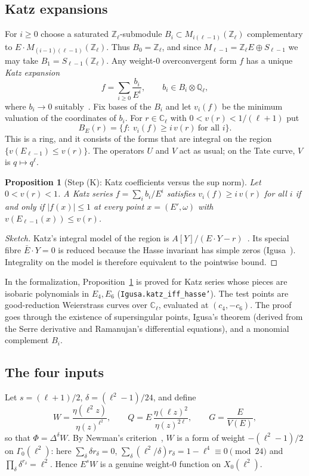 \documentclass[11pt]{amsart}
\newcommand{\Zl}{\mathbb{Z}_\ell}
\newcommand{\Ql}{\mathbb{Q}_\ell}
\newcommand{\Cl}{\mathbb{C}_\ell}
\newcommand{\lean}[1]{\texttt{#1}}
\theoremstyle{plain}
\newtheorem{proposition}[theorem]{Proposition}
\theoremstyle{definition}
\numberwithin{equation}{section}
\begin{document}
\subsection{Katz expansions}
For $i\ge0$ choose a saturated $\Zl$-submodule $B_i\subset M_{i(\ell-1)}(\Zl)$ complementary to
$E\cdot M_{(i-1)(\ell-1)}(\Zl)$. Thus $B_0=\Zl$, and since $M_{\ell-1}=\Zl E\oplus S_{\ell-1}$ we may take
$B_1=S_{\ell-1}(\Zl)$. Any weight-$0$ overconvergent form $f$ has a unique \emph{Katz expansion}
\[
  f=\sum_{i\ge0}\frac{b_i}{E^i},\qquad b_i\in B_i\otimes\Ql,
\]
where $b_i\to0$ suitably~\cite[\S2.6]{Katz1973}. Fix bases of the $B_i$ and let $v_i(f)$ be the minimum valuation of
the coordinates of $b_i$. For $r\in\Cl$ with $0<v(r)<1/(\ell+1)$ put
\[
  B_E(r)=\{f:\ v_i(f)\ge i\,v(r)\ \text{for all } i\}.
\]
This is a ring, and it consists of the forms that are integral on the region $\{v(E_{\ell-1})\le v(r)\}$. The operators
$U$ and $V$ act as usual; on the Tate curve, $V$ is $q\mapsto q^\ell$.

\begin{proposition}[Step (K): Katz coefficients versus the sup norm]\label{prop:K}
Let $0<v(r)<1$. A Katz series $f=\sum_i b_i/E^i$ satisfies $v_i(f)\ge i\,v(r)$ for all $i$ if and only if
$|f(x)|\le1$ at every point $x=(E',\omega)$ with $v(E_{\ell-1}(x))\le v(r)$.
\end{proposition}
\begin{proof}[Sketch]
Katz's integral model of the region is $A[Y]/(E\cdot Y-r)$~\cite[\S\S2.6--2.8]{Katz1973}. Its special fibre $\bar E\cdot Y=0$ is
reduced because the Hasse invariant has simple zeros (Igusa~\cite{Igusa1958}). Integrality on the model is therefore
equivalent to the pointwise bound.
\end{proof}

In the formalization, Proposition~\ref{prop:K} is proved for Katz series whose pieces are isobaric polynomials in
$E_4,E_6$ (\lean{Igusa.katz\_iff\_hasse'}). The test points are good-reduction Weierstrass curves over $\Cl$, evaluated at
$(c_4,-c_6)$. The proof goes through the existence of supersingular points, Igusa's theorem (derived from the Serre
derivative and Ramanujan's differential equations), and a monomial complement $B_i$.

\subsection{The four inputs}\label{sec:inputs}
Let $s=(\ell+1)/2$, $\delta=(\ell^2-1)/24$, and define
\[
  W=\frac{\eta(\ell^2z)}{\eta(z)^{\ell^2}},\qquad Q=E\,\frac{\eta(\ell z)^2}{\eta(z)^{2\ell}},\qquad G=\frac{E}{V(E)},
\]
so that $\Phi=\Delta^\delta W$. By Newman's criterion~\cite{Newman1959}, $W$ is a form of weight $-(\ell^2-1)/2$ on
$\Gamma_0(\ell^2)$: here $\sum_\delta \delta r_\delta=0$, $\sum_\delta(\ell^2/\delta)r_\delta=1-\ell^4\equiv0\pmod{24}$ and
$\prod_\delta\delta^{r_\delta}=\ell^2$. Hence $E^sW$ is a genuine weight-$0$ function on $X_0(\ell^2)$.
\end{document}
